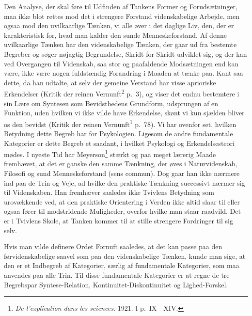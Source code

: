 \documentclass[12pt]{article}
\newcommand{\opage}[1]{\marginnote{\footnotesize\textit{[#1]}}}
\begin{document}
Den Analyse, der skal føre til Udfinden af Tankens
Former og Forudsætninger, maa ikke blot rettes mod det
i strengere Forstand videnskabelige Arbejde, men ogsaa
mod den uvilkaarlige Tænken, vi alle øver i det daglige
Liv, den, der er karakteristisk for, hvad man kalder \guillemotright den
sunde Menneskeforstand\guillemotleft. Af denne uvilkaarlige Tænken
har den videnskabelige Tænken, der gaar ud fra bestemte
Begreber og søger nøjagtig Begrundelse, Skridt for Skridt
udviklet sig, og der kan ved Overgangen til Videnskab,
saa stor og paafaldende Modsætningen end kan være, ikke
være nogen fuldstændig Forandring i Maaden at tænke
paa. Kant saa dette, da han udtalte, at selv \guillemotright der gemeine
Verstand\guillemotleft{} har visse \guillemotright aprioriske Erkendelser\guillemotleft{}
(Kritik der reinen Vernunft\textsuperscript{2} p.~3), og viser det endnu bestemtere i sin
Lære om Syntesen som Bevidsthedens Grundform, udsprungen
af \guillemotright en Funktion, uden hvilken vi ikke vilde have
Erkendelse, skønt vi kun sjælden bliver os den bevidst\guillemotleft{}
(Kritik der reinen Vernunft\textsuperscript{1} p.~78). Vi har ovenfor set,
hvilken Betydning dette Begreb har for Psykologien. Ligesom
de andre fundamentale Kategorier er dette Begreb et
saadant, i hvilket Psykologi og Erkendelsesteori mødes. I
nyeste Tid har Meyerson\footnote{\textit{De l'explication dans
les sciences.} 1921. I p.~IX---XIV.} stærkt og paa meget lærerig
Maade fremhævet, at det er ganske den samme Tænkning,
\opage{27} der øves i Naturvidenskab, Filosofi og sund Menneskeforstand
(sens commun). Dog gaar han ikke nærmere ind
paa de Trin og Veje, ad hvilke den praktiske Tænkning
successivt nærmer sig til Videnskaben. Han fremhæver
saaledes ikke Tvivlens Betydning som urovækkende ved,
at den praktiske Orientering i Verden ikke altid slaar til
eller ogsaa fører til modstridende Muligheder, overfor hvilke
man staar raadvild. Det er i Tvivlens Skole, at Tanken
kommer til at stille strengere Fordringer til sig selv.

Hvis man vilde definere Ordet \guillemotright Fornuft\guillemotleft{} saaledes, at
det kan passe paa den førvidenskabelige saavel som paa
den videnskabelige Tænken, kunde man sige, at den er et
Indbegreb af Kategorier, særlig af fundamentale Kategorier,
som maa anvendes paa alle Trin. Til disse fundamentale
Kategorier er at regne de tre Begrebspar Syntese-Relation,
Kontinuitet-Diskontinuitet og Lighed-Forskel.
\end{document}

